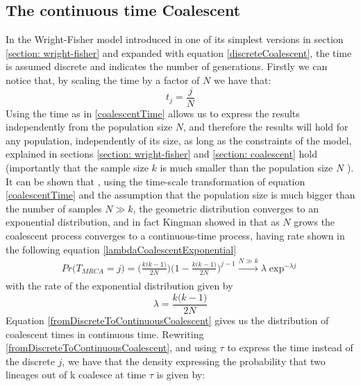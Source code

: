 \documentclass[12pt,mythesisstyle]{report}
\begin{document}
\subsection{The continuous time Coalescent} 
In the Wright-Fisher model introduced in one of its simplest versions in section \ref{section: wright-fisher} and expanded with equation \eqref{discreteCoalescent}, the time is assumed discrete and indicates the number of generations. Firstly we can notice that, by scaling the time by a factor of $N$ \cite{coalescentPrimer} we have that:
\begin{equation}\label{coalescentTime}
t_j=\frac{j}{N}
\end{equation}
Using the time as in \eqref{coalescentTime} allows us to express the results independently from the population size $N$, and therefore the results will hold for any population, independently of its size, as long as the constraints of the model, explained in sections \ref{section: wright-fisher} and \ref{section: coalescent} hold (importantly that the sample size $k$ is much smaller than the population size $N$ \cite{coalescentPrimer}). It can be shown that \cite{coalescentPrimer}, using the time-scale transformation of equation \eqref{coalescentTime} and the assumption that the population size is much bigger than the number of samples $N\gg k$, the geometric distribution converges to an exponential distribution, and in fact Kingman showed in \cite{kingman} that as $N$ grows the coalescent process converges to a continuous-time process, having rate shown in the following equation \eqref{lambdaCoalescentExponential}
\begin{equation}\label{fromDiscreteToContinuousCoalescent}
\begin{split}
Pr\big(T_{MRCA}=j \big)=\bigg(\frac{k\big(k-1)}{2N}\bigg) \bigg(1-\frac{k\big(k-1)}{2N}\bigg)^{j-1} \xrightarrow[]{N\gg k}\lambda \exp ^{-\lambda j}
\end{split}
\end{equation}
with the rate of the exponential distribution given by 
\begin{equation}\label{lambdaCoalescentExponential}
\lambda=\frac{k\big(k-1)}{2N}
\end{equation}
Equation \eqref{fromDiscreteToContinuousCoalescent} gives us the distribution of coalescent times in continuous time. Rewriting \eqref{fromDiscreteToContinuousCoalescent}, and using $\tau$ to express the time instead of the discrete $j$, we have that the density expressing the probability that two lineages out of k coalesce at time $\tau$ is given by:
\end{document}
